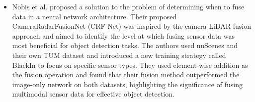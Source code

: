 \documentclass[rnd]{mas_proposal}
\begin{document}
\begin{itemize}
      \item Nobis et al. \cite{nobis2019deep} proposed a solution to the problem of determining when to fuse data in a neural network architecture. Their proposed CameraRadarFusionNet (CRF-Net) was inspired by the camera-LiDAR fusion approach \cite{yu2019multi, caltagirone2019lidar} and aimed to identify the level at which fusing sensor data was most beneficial for object detection tasks. The authors used nuScenes \cite{caesar2020nuscenes} and their own TUM dataset and introduced a new training strategy called BlackIn to focus on specific sensor types. They used element-wise addition as the fusion operation and found that their fusion method outperformed the image-only network on both datasets, highlighting the significance of fusing multimodal sensor data for effective object detection.
      

\end{itemize}
\end{document}
